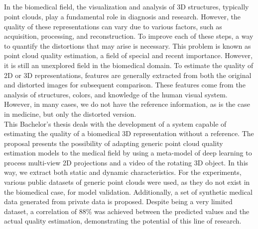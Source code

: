 \cleardoublepage


\thispagestyle{empty}


\begin{center}
{\large\bfseries \myTitleENG}\\
\end{center}
\begin{center}
\myName \\
\end{center}

\\

\\

In the biomedical field, the visualization and analysis of 3D structures, 
typically point clouds, play a fundamental role in diagnosis and research. 
However, the quality of these representations can vary due to various factors, 
such as acquisition, processing, and reconstruction. 
To improve each of these steps, a way to quantify the distortions that may 
arise is necessary. This problem is known as point cloud quality estimation, 
a field of special and recent importance. However, it is still an unexplored 
field in the biomedical domain.
To estimate the quality of 2D or 3D representations, features are generally 
extracted from both the original and distorted images for subsequent comparison. 
These features come from the analysis of structures, colors, and knowledge of 
the human visual system. However, in many cases, we do not have the reference 
information, as is the case in medicine, but only the distorted version.
\\

This Bachelor's thesis deals with the development of a system capable of estimating 
the quality of a biomedical 3D representation without a reference. The proposal 
presents the possibility of adapting generic point cloud quality estimation models 
to the medical field by using a meta-model of deep learning to process multi-view 
2D projections and a video of the rotating 3D object. In this way, 
we extract both static and dynamic characteristics.
For the experiments, various public datasets of generic point clouds were used, 
as they do not exist in the biomedical case, for model validation. 
Additionally, a set of synthetic medical data generated from private data is proposed. 
Despite being a very limited dataset, a correlation of 88\% was achieved between 
the predicted values and the actual quality estimation, demonstrating the potential of this line of research.

